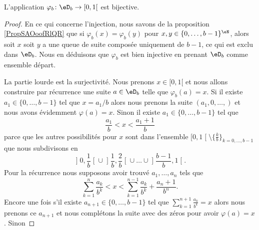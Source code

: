 \begin{theorem} \label{ThoRXBootpUpd}
    L'application \( \varphi_b\colon \eD_b\to \mathopen[ 0 , 1 [\) est bijective.
\end{theorem}

\begin{proof}
    En ce qui concerne l'injection, nous savons de la proposition \ref{PropSAOoofRlQR} que si \( \varphi_b(x)=\varphi_b(y)\) pour \( x,y\in\{ 0,\ldots, b-1 \}^{\eN}\), alors soit \( x\) soit \( y\) a une queue de suite composée uniquement de \( b-1\), ce qui est exclu dans \( \eD_b\). Nous en déduisons que \( \varphi_b\) est bien injective en prenant \( \eD_b\) comme ensemble départ.

    La partie lourde est la surjectivité. Nous prenons \( x\in \mathopen[ 0 , 1 [\) et nous allons construire par récurrence une suite \( a\in \eD_b\) telle que \( \varphi_b(a)=x\). Si il existe \( a_1\in\{ 0,\ldots, b-1 \}\) tel que \( x=a_1/b\) alors nous prenons la suite \( (a_1,0,\ldots, )\) et nous avons évidemment \( \varphi(a)=x\). Sinon il existe \( a_1\in\{ 0,\ldots, b-1 \}\) tel que
        \begin{equation}
            \frac{ a_1 }{ b }<x<\frac{ a_1+1 }{ b }
        \end{equation}
        parce que les autres possibilités pour \( x\) sont dans l'ensemble \( \mathopen[ 0 , 1 \mathclose[\setminus\{ \frac{ k }{ b } \}_{k=0,\ldots, b-1}\) que nous subdivisons en
        \begin{equation}
        \mathopen] 0 , \frac{1}{ b } \mathclose[\cup\mathopen] \frac{1}{ b } , \frac{ 2 }{ b } \mathclose[\cup\ldots\cup\mathopen] \frac{ b-1 }{ b } , 1 \mathclose[.
        \end{equation}
        Pour la récurrence nous supposons avoir trouvé \( a_1,\ldots, a_n\) tels que
        \begin{equation}
            \sum_{k=1}^n\frac{ a_k }{ b^k }< x<\sum_{k=1}^{n-1}\frac{ a_k }{ b^k }+\frac{ a_n+1 }{ b^n }.
        \end{equation}
    Encore une fois s'il existe \( a_{n+1}\in\{ 0,\ldots, b-1 \}\) tel que \( \sum_{k=1}^{n+1}\frac{ a_k }{ b^k }=x\) alors nous prenons ce \( a_{n+1}\) et nous complétons la suite avec des zéros pour avoir \( \varphi(a)=x\). Sinon 

\end{proof}

